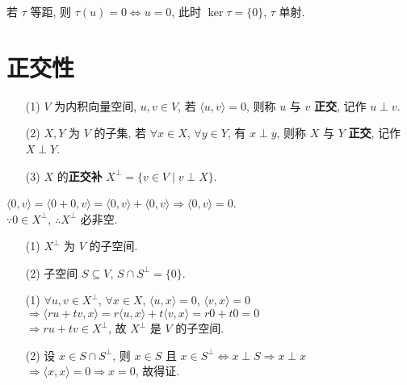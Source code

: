 \documentclass{note}
\begin{document}
若 $\tau$ 等距, 则 $\tau(u)=0\Longleftrightarrow u=0$, 此时 $\ker\tau=\{0\}$, $\tau$ 单射.

\section{正交性}
\begin{df}[正交]
    \begin{itemize}
        \item[(1)] $V$ 为内积向量空间, $u,v\in V$, 若 $\langle u,v\rangle=0$, 则称 $u$ 与 $v$ \textbf{正交}, 记作 $u\perp v$.
        \item[(2)] $X,Y$ 为 $V$ 的子集, 若 $\forall x\in X$, $\forall y\in Y$, 有 $x\perp y$, 则称 $X$ 与 $Y$ \textbf{正交}, 记作 $X\perp Y$.
        \item[(3)] $X$ 的\textbf{正交补} $X^{\perp}=\{v\in V\mid v\perp X\}$.
    \end{itemize}
\end{df}

$\langle 0,v\rangle=\langle 0+0,v\rangle=\langle 0,v\rangle+\langle 0,v\rangle\Longrightarrow\langle 0,v\rangle=0$.\\
$\because 0\in X^{\perp}$, $\therefore X^{\perp}$ 必非空.

\begin{thm}[(课本定理 9.7)]
    \begin{itemize}
        \item[(1)] $X^{\perp}$ 为 $V$ 的子空间.
        \item[(2)] 子空间 $S\subseteq V$, $S\cap S^{\perp}=\{0\}$.
    \end{itemize}
\end{thm}
\begin{pf}
    \begin{itemize}
        \item[(1)] $\forall u,v\in X^{\perp}$, $\forall x\in X$, $\langle u,x\rangle=0$, $\langle v,x\rangle=0$\\
        $\Longrightarrow\langle ru+tv,x\rangle=r\langle u,x\rangle+t\langle v,x\rangle=r0+t0=0$\\
        $\Longrightarrow ru+tv\in X^{\perp}$, 故 $X^{\perp}$ 是 $V$ 的子空间.
        \item[(2)] 设 $x\in S\cap S^{\perp}$, 则 $x\in S$ 且 $x\in S^{\perp}\Longleftrightarrow x\perp S\Longrightarrow x\perp x$\\
        $\Longrightarrow\langle x,x\rangle=0\Longrightarrow x=0$, 故得证.
    \end{itemize}
\end{pf}
\end{document}
